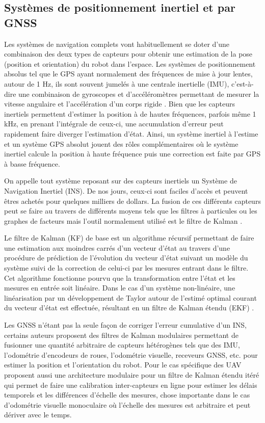 \subsection{Systèmes de positionnement inertiel et par GNSS}

Les systèmes de navigation complets vont habituellement se doter d'une combinaison des deux types de capteurs pour obtenir une estimation de la pose (position et orientation) du robot dans l'espace. Les systèmes de positionnement absolus tel que le GPS ayant normalement des fréquences de mise à jour lentes, autour de 1 Hz, ils sont souvent jumelés à une centrale inertielle (IMU), c'est-à-dire une combinaison de gyroscopes et d'accéléromètres permettant de mesurer la vitesse angulaire et l'accélération d'un corps rigide \citep{Noureldin2013}. Bien que les capteurs inertiels permettent d'estimer la position à de hautes fréquences, parfois même 1 kHz, en prenant l'intégrale de ceux-ci, une accumulation d'erreur peut rapidement faire diverger l'estimation d'état. Ainsi, un système inertiel à l'estime et un système GPS absolut jouent des rôles complémentaires où le système inertiel calcule la position à haute fréquence puis une correction est faite par GPS à basse fréquence.

On appelle tout système reposant sur des capteurs inertiels un Système de Navigation Inertiel (INS). De nos jours, ceux-ci sont faciles d'accès et peuvent êtres achetés pour quelques milliers de dollars. La fusion de ces différents capteurs peut se faire au travers de différents moyens tels que les filtres à particules \citep{Carvalho1997} ou les graphes de facteurs \citep{Indelman2012} mais l'outil normalement utilisé est le filtre de Kalman \citep{Noureldin2013}.

Le filtre de Kalman (KF) de base est un algorithme récursif permettant de faire une estimation aux moindres carrés d'un vecteur d'état au travers d'une procédure de prédiction de l'évolution du vecteur d'état suivant un modèle du système suivi de la correction de celui-ci par les mesures entrant dans le filtre. Cet algorithme fonctionne pourvu que la transformation entre l'état et les mesures en entrée soit linéaire. Dans le cas d'un système non-linéaire, une linéarisation par un développement de Taylor autour de l'estimé optimal courant du vecteur d'état est effectuée, résultant en un filtre de Kalman étendu (EKF) \citep{Chui2017}.

Les GNSS n'étant pas la seule façon de corriger l'erreur cumulative d'un INS, certains auteurs proposent des filtres de Kalman modulaires permettant de fusionner une quantité arbitraire de capteurs hétérogènes tels que des IMU, l'odométrie d'encodeurs de roues, l'odométrie visuelle, receveurs GNSS, etc. \citep{MooreEkf2014} pour estimer la position et l'orientation du robot. Pour le cas spécifique des UAV \citep{Lynen2013} proposent aussi une architecture modulaire pour un filtre de Kalman étendu itéré qui permet de faire une calibration inter-capteurs en ligne pour estimer les délais temporels et les différences d'échelle des mesures, chose importante dans le cas d'odométrie visuelle monoculaire où l'échelle des mesures est arbitraire et peut dériver avec le temps.

